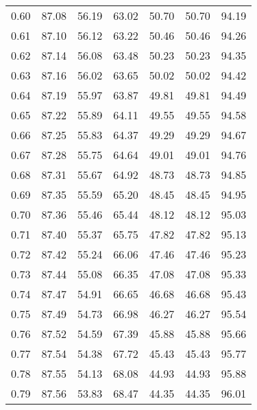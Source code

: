 \begin{tabular}{|c|c|c|c|c|c|c|}
      0.60 &     87.08 &     56.19 &      63.02 &   50.70 &      50.70 &         94.19 \\
      0.61 &     87.10 &     56.12 &      63.22 &   50.46 &      50.46 &         94.26 \\
      0.62 &     87.14 &     56.08 &      63.48 &   50.23 &      50.23 &         94.35 \\
      0.63 &     87.16 &     56.02 &      63.65 &   50.02 &      50.02 &         94.42 \\
      0.64 &     87.19 &     55.97 &      63.87 &   49.81 &      49.81 &         94.49 \\
      0.65 &     87.22 &     55.89 &      64.11 &   49.55 &      49.55 &         94.58 \\
      0.66 &     87.25 &     55.83 &      64.37 &   49.29 &      49.29 &         94.67 \\
      0.67 &     87.28 &     55.75 &      64.64 &   49.01 &      49.01 &         94.76 \\
      0.68 &     87.31 &     55.67 &      64.92 &   48.73 &      48.73 &         94.85 \\
      0.69 &     87.35 &     55.59 &      65.20 &   48.45 &      48.45 &         94.95 \\
      0.70 &     87.36 &     55.46 &      65.44 &   48.12 &      48.12 &         95.03 \\
      0.71 &     87.40 &     55.37 &      65.75 &   47.82 &      47.82 &         95.13 \\
      0.72 &     87.42 &     55.24 &      66.06 &   47.46 &      47.46 &         95.23 \\
      0.73 &     87.44 &     55.08 &      66.35 &   47.08 &      47.08 &         95.33 \\
      0.74 &     87.47 &     54.91 &      66.65 &   46.68 &      46.68 &         95.43 \\
      0.75 &     87.49 &     54.73 &      66.98 &   46.27 &      46.27 &         95.54 \\
      0.76 &     87.52 &     54.59 &      67.39 &   45.88 &      45.88 &         95.66 \\
      0.77 &     87.54 &     54.38 &      67.72 &   45.43 &      45.43 &         95.77 \\
      0.78 &     87.55 &     54.13 &      68.08 &   44.93 &      44.93 &         95.88 \\
      0.79 &     87.56 &     53.83 &      68.47 &   44.35 &      44.35 &         96.01 \\

\end{tabular}
